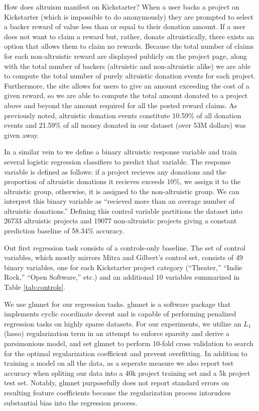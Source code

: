 \documentclass[letterpaper]{article}
\begin{document}
How does altruism manifest on Kickstarter? When a user backs a project on Kickstarter (which is impossible to do anonymously) they are prompted to select a backer reward of value less than or equal to their donation amount. If a user does not want to claim a reward but, rather, donate altruistically, there exists an option that allows them to claim no rewards. Because the total number of claims for each non-altruistic reward are displayed publicly on the project page, along with the total number of backers (altruistic and non-altruistic alike) we are able to compute the total number of purely altruistic donation events for each project. Furthermore, the site allows for users to give an amount exceeding the cost of a given reward, so we are able to compute the total amount donated to a project above and beyond the amount required for all the posted reward claims. As previously noted, altruistic donation events constitute 10.59\% of all donation events and 21.59\% of all money donated in our dataset (over 53M dollars) was given away.

In a similar vein to \cite{mitra2014language} we define a binary altruistic response variable and train several logistic regression classifiers to predict that variable. The response variable is defined as follows: if a project recieves any donations and the proportion of altruistic donations it recieves exceeds $10\%$, we assign it to the altruistic group, otherwise, it is assigned to the non-altruistic group. We can interpret this binary variable as ``recieved more than an average number of altruistic donations.'' Defining this control variable partitions the dataset into 26733 altruistic projects and 19077 non-altruistic projects giving a constant prediction baseline of 58.34\% accuracy.

Out first regression task consists of a controls-only baseline. The set of control variables, which mostly mirrors Mitra and Gilbert's control set, consists of 49 binary variables, one for each Kickstarter project category (``Theater,'' ``Indie Rock,'' ``Open Software,'' etc.) and an additional 10 variables summarized in Table \ref{tab:controls}.

We use glmnet \cite{friedman2010glmnet} for our regression tasks. glmnet is a software package that implements cyclic coordinate decent and is capable of performing penalized regression tasks on highly sparse datasets. For our experiments, we utilize an $L_1$ (lasso) regularization term in an attempt to enforce sparsity and derive a parsimonious model, and set glmnet to perform 10-fold cross validation to search for the optimal regularization coefficient and prevent overfitting. In addition to training a model on all the data, as a seperate measure we also report test accuracy when spliting our data into a 40k project training set and a 5k project test set. Notably, glmnet purposefully does not report standard errors on resulting feature coefficients because the regularization process intorudces substantial bias into the regression process.
\end{document}
